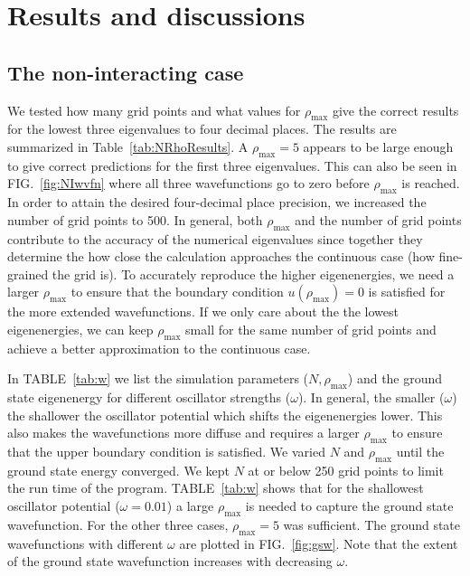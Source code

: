 \documentclass[10pt,showpacs,preprintnumbers,footinbib,amsmath,amssymb,aps,prl,twocolumn,groupedaddress,superscriptaddress,showkeys]{revtex4-1}
\newcommand{\rhomax}{
	\ensuremath{ \rho _{\mathrm{max}}} }
\begin{document}
{\section{Results and discussions}

\subsection{The non-interacting case}

We tested how many grid points and what values for \rhomax give
the correct results for the lowest three eigenvalues to four decimal places.
The results are summarized in Table~\ref{tab:NRhoResults}. A
$\rhomax = 5$ appears to be large enough to give correct predictions
for the first three eigenvalues. This can also be seen in FIG.~\ref{fig:NIwvfn}
where all three wavefunctions go to zero before \rhomax is reached.
In order to attain the desired four-decimal
place precision, we increased the number of grid points to 500. In general,
both \rhomax and the number of grid points contribute to the accuracy of
the numerical eigenvalues since together they determine the how close
the calculation approaches the continuous case (how fine-grained the grid is).
To accurately reproduce the higher
eigenenergies, we need a larger \rhomax to ensure that the boundary
condition $u(\rhomax)=0$ is satisfied for the more extended
wavefunctions. If we only care about the the
lowest eigenenergies, we can keep \rhomax small for the same number
of grid points and achieve a better approximation to the continuous
case.

In TABLE~\ref{tab:w} we list the simulation parameters ($N,\rhomax$)
and the ground state eigenenergy for different oscillator strengths ($\omega$).
In general, the smaller ($\omega$) the shallower the oscillator potential which
shifts the eigenenergies lower. This also makes the wavefunctions more diffuse
and requires a larger \rhomax to ensure that the upper boundary condition is
satisfied. We varied $N$ and \rhomax until the ground state energy converged.
We kept $N$ at or below 250 grid points to limit the run time of the program.
TABLE~\ref{tab:w} shows that for the shallowest oscillator potential ($\omega = 0.01$)
a large \rhomax is needed to capture the ground state wavefunction. For the
other three cases, $\rhomax=5$ was sufficient. The ground state wavefunctions
with different $\omega$ are plotted in FIG.~\ref{fig:gsw}. Note that the extent of
the ground state wavefunction increases with decreasing $\omega$.


}
\end{document}
